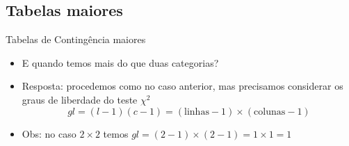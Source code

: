 \documentclass{beamer}
\begin{document}
\subsection{Tabelas maiores}

\begin{frame}{Tabelas de Contingência maiores}
  \small
  \begin{itemize}
  \item E quando temos mais do que duas categorias?
    \bigskip
  \item Resposta: procedemos como no caso anterior, mas precisamos
    considerar os \alert{graus de liberdade} do teste $\chi^2$
    \begin{displaymath}
        gl = (l-1)(c-1) = (\text{linhas} -1)\times (\text{colunas}-1)
    \end{displaymath}
    \bigskip
  \item Obs: no caso $2 \times 2$ temos $gl = (2-1) \times (2-1)=1
    \times 1 = 1$
  \end{itemize}
\end{frame}




\end{document}
